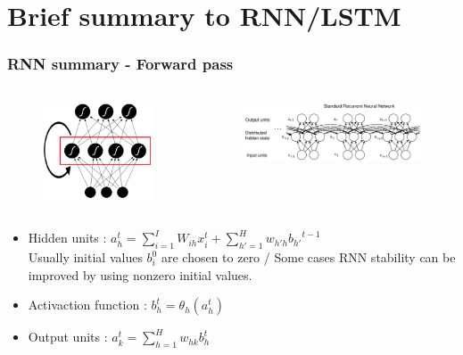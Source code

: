 \documentclass{beamer}
\begin{document}
\section{Brief summary to RNN/LSTM}
\frame
{
    \frametitle{RNN summary - Forward pass}
    \begin{columns}[c]
		\begin{figure}[ht]  
			\begin{center}
				\includegraphics[width=1.6in]{Images/recurrentNN.png}   
			\end{center}   
		\end{figure}
			\begin{figure}[ht]  
    			\begin{center}
    				\includegraphics[width=2.6in]{Images/standard_rnn.png}       			
    			\end{center}
    			\end{figure}
	\end{columns}
    \begin{itemize}
        \item Hidden units : 
        $ a_h^t = {\sum_{i=1}^I} W_{ih}x_i^t + \sum_{h'=1}^H w_{h'h} {b_{h'}}^{t-1} $ \\
        Usually initial values $b_i^0$ are chosen to zero / 
        Some cases RNN stability can be improved by using nonzero initial values.
        \item Activaction function :
        $ b_h^t = \theta_h(a_h^t) $
        \item Output units : 
        $ a_k^t = \sum_{h=1}^H w_{hk}b_h^t $
    \end{itemize}
}
\frame
\end{document}
